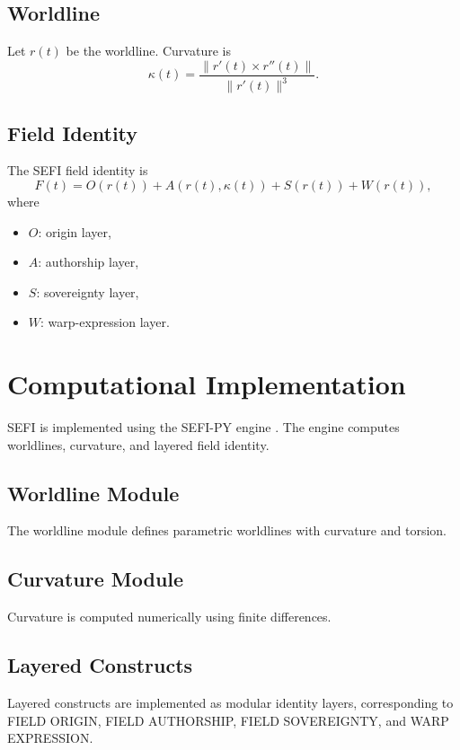 \documentclass[12pt]{article}
\begin{document}
\subsection{Worldline}
Let \( r(t) \) be the worldline. Curvature is
\begin{equation}
\kappa(t) = \frac{\| r'(t) \times r''(t) \|}{\| r'(t) \|^3}.
\end{equation}

\subsection{Field Identity}
The SEFI field identity is
\begin{equation}
F(t) = O(r(t)) + A(r(t), \kappa(t)) + S(r(t)) + W(r(t)),
\end{equation}
where
\begin{itemize}
    \item \( O \): origin layer,
    \item \( A \): authorship layer,
    \item \( S \): sovereignty layer,
    \item \( W \): warp-expression layer.
\end{itemize}

\section{Computational Implementation}
SEFI is implemented using the SEFI-PY engine \cite{DuttonSEFIPY}. The engine computes worldlines, curvature, and layered field identity.

\subsection{Worldline Module}
The worldline module defines parametric worldlines with curvature and torsion.

\subsection{Curvature Module}
Curvature is computed numerically using finite differences.

\subsection{Layered Constructs}
Layered constructs are implemented as modular identity layers, corresponding to FIELD ORIGIN, FIELD AUTHORSHIP, FIELD SOVEREIGNTY, and WARP EXPRESSION.
\end{document}
